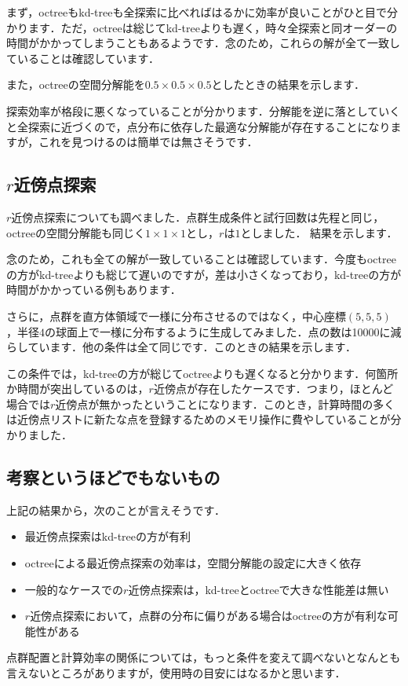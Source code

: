 ﻿\documentclass[a4paper]{jsarticle}
\begin{document}
まず，octreeもkd-treeも全探索に比べればはるかに効率が良いことがひと目で分かります．ただ，octreeは総じてkd-treeよりも遅く，時々全探索と同オーダーの時間がかかってしまうこともあるようです．念のため，これらの解が全て一致していることは確認しています．

また，octreeの空間分解能を$0.5\times0.5\times0.5$としたときの結果を示します．
\begin{figure*}[h]
\centering

\end{figure*}
探索効率が格段に悪くなっていることが分かります．分解能を逆に落としていくと全探索に近づくので，点分布に依存した最適な分解能が存在することになりますが，これを見つけるのは簡単では無さそうです．


\subsection{$r$近傍点探索}

$r$近傍点探索についても調べました．点群生成条件と試行回数は先程と同じ，octreeの空間分解能も同じく$1\times1\times1$とし，$r$は$1$としました．
結果を示します．
\begin{figure*}[h]
\centering

\end{figure*}
念のため，これも全ての解が一致していることは確認しています．今度もoctreeの方がkd-treeよりも総じて遅いのですが，差は小さくなっており，kd-treeの方が時間がかかっている例もあります．

さらに，点群を直方体領域で一様に分布させるのではなく，中心座標$(5,5,5)$，半径$4$の球面上で一様に分布するように生成してみました．点の数は10000に減らしています．他の条件は全て同じです．このときの結果を示します．
\begin{figure*}[h]
\centering

\end{figure*}
この条件では，kd-treeの方が総じてoctreeよりも遅くなると分かります．何箇所か時間が突出しているのは，$r$近傍点が存在したケースです．つまり，ほとんど場合では$r$近傍点が無かったということになります．このとき，計算時間の多くは近傍点リストに新たな点を登録するためのメモリ操作に費やしていることが分かりました．

\subsection{考察というほどでもないもの}

上記の結果から，次のことが言えそうです．
\begin{itemize}
\item 最近傍点探索はkd-treeの方が有利
\item octreeによる最近傍点探索の効率は，空間分解能の設定に大きく依存
\item 一般的なケースでの$r$近傍点探索は，kd-treeとoctreeで大きな性能差は無い
\item $r$近傍点探索において，点群の分布に偏りがある場合はoctreeの方が有利な可能性がある
\end{itemize}
点群配置と計算効率の関係については，もっと条件を変えて調べないとなんとも言えないところがありますが，使用時の目安にはなるかと思います．
\end{document}

